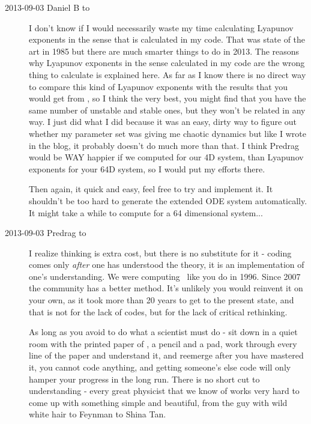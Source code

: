 \begin{description}
\item[2013-09-03 Daniel B to \XD]
I don't know if I would necessarily waste my time calculating Lyapunov
exponents in the sense that is calculated in my code. That was state of
the art in 1985 but there are much smarter things to do in 2013. The
reasons why Lyapunov exponents in the sense calculated in my code are the
wrong thing to calculate is explained
 {here}. As
far as I know there is no direct way to compare this kind of Lyapunov
exponents with the results that you would get from {\cLvs}, so I think
the very best, you might find that you have the same number of unstable
and stable ones, but they won't be related in any way. I just did what I
did because it was an easy, dirty way to figure out whether my parameter
set was giving me chaotic dynamics but like I wrote in the blog, it
probably doesn't do much more than that. I think Predrag would be WAY
happier if we computed {\cLvs} for our 4D system, than Lyapunov exponents
for your 64D system, so I would put my efforts there.

Then again, it quick and easy, feel free to try and implement it. It
shouldn't be too hard to generate the extended ODE system automatically.
It might take a while to compute for a 64 dimensional system...


\item[2013-09-03 Predrag to \XD]
I realize thinking is extra cost, but there is no substitute for it - coding comes only \emph{after} one has understood the theory, it is an implementation of one's understanding.
We were computing \jacobianMs\ like you do in 1996. Since
2007 the community has a better method. It's unlikely
you would reinvent it on your own, as it took more than 20 years to get to the
present state, and that is not for the lack of codes, but for the lack of critical
rethinking.

As long as you avoid to do what a scientist must do - sit down in a quiet room with the printed paper of , a pencil and a pad, work through every line of the paper and understand it, and reemerge after you have mastered it, you cannot code anything, and getting someone's else code will only hamper your progress in the long run.
There is no short cut to understanding - every great physicist that we know of
works very hard to come up with something simple and beautiful, from the guy with
wild white hair to Feynman to Shina Tan.


\end{description}
